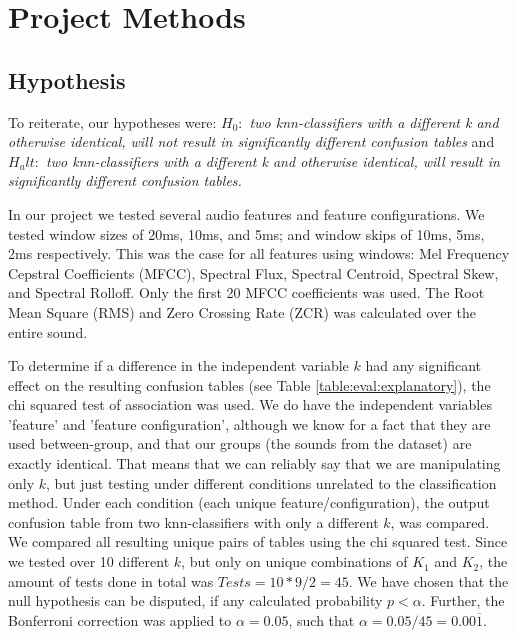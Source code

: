 \section{Project Methods}

	\subsection{Hypothesis}
		To reiterate, our hypotheses were: \emph{$H_0:$ two knn-classifiers with a different k and otherwise identical, will not result in significantly different confusion tables} and \emph{$H_alt:$ two knn-classifiers with a different k and otherwise identical, will result in significantly different confusion tables.}
		
		In our project we tested several audio features and feature configurations.
		We tested window sizes of 20ms, 10ms, and 5ms; and window skips of 10ms, 5ms, 2ms respectively. This was the case for all features using windows: Mel Frequency Cepstral Coefficients (MFCC), Spectral Flux, Spectral Centroid, Spectral Skew, and Spectral Rolloff. Only the first 20 MFCC coefficients was used. The Root Mean Square (RMS) and Zero Crossing Rate (ZCR) was calculated over the entire sound.
		
		To determine if a difference in the independent variable $k$ had any significant effect on the resulting confusion tables (see Table \ref{table:eval:explanatory}), the chi squared test of association was used. We do have the independent variables 'feature' and 'feature configuration', although we know for a fact that they are used between-group, and that our groups (the sounds from the dataset) are exactly identical. That means that we can reliably say that we are manipulating only $k$, but just testing under different conditions unrelated to the classification method. Under each condition (each unique feature/configuration), the output confusion table from two knn-classifiers with only a different $k$, was compared. We compared all resulting unique pairs of tables using the chi squared test. Since we tested over 10 different $k$, but only on unique combinations of $K_1$ and $K_2$, the amount of tests done in total was $Tests = 10*9/2 = 45$. We have chosen that the null hypothesis can be disputed, if any calculated probability $p < \alpha$. Further, the Bonferroni correction\citep{bonferroni} was applied to $\alpha=0.05$, such that $\alpha=0.05/45 = 0.00\overline{1}$.
		
